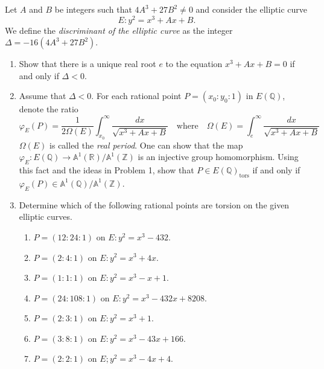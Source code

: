 \documentclass[12 pt, letterpaper]{hmcpset}
\begin{document}
\begin{problem}[Problem 3.]
	Let $A$ and $B$ be integers such that $4A^{3} + 27 B^{2} \neq 0$ and consider the elliptic curve
	\[
		E : y^{2} = x^{3} + A x + B.
	\]
	We define the \emph{discriminant of the elliptic curve} as the integer $\Delta = -16(4 A^{3} + 27 B^{2})$.
	\begin{enumerate}
		\item Show that there is a unique real root $e$ to the equation $x^{3} + A x + B = 0$ if and only if $\Delta < 0$.
		\item Assume that $\Delta < 0$. For each rational point $P = (x_{0} : y_{0} : 1)$ in $E(\mathbb{Q})$, denote the ratio
			\[
				\varphi_{E}(P) = \frac{1}{2 \Omega(E)} \int_{x_{0}}^{\infty} \frac{dx}{\sqrt{x^{3} + A x + B}} \quad \text{where} \quad \Omega(E) = \int_{e}^{\infty} \frac{dx}{\sqrt{x^{3} + Ax + B}} 
			\]
			$\Omega(E)$ is called the \emph{real period}. One can show that the map $\varphi_{E} : E(\mathbb{Q}) \to \mathbb{A}^{1}(\mathbb{R}) / \mathbb{A}^{1}(\mathbb{Z})$ is an injective group homomorphism. Using this fact and the ideas in Problem 1, show that $P \in E(\mathbb{Q})_{\text{tors}}$ if and only if $\varphi_{E}(P) \in \mathbb{A}^{1}(\mathbb{Q}) / \mathbb{A}^{1}(\mathbb{Z})$.
		\item Determine which of the following rational points are torsion on the given elliptic curves.
			\begin{enumerate}[label = (\roman*)]
				\item $P = (12 : 24 : 1)$ on $E : y^{2} = x^{3} - 432$.
				\item $P = (2 : 4 : 1)$ on $E : y^{2} = x^{3} + 4x$.
				\item $P = (1 : 1 : 1)$ on $E : y^{2} = x^{3} - x + 1$.
				\item $P = (24 : 108 : 1)$ on $E : y^{2} = x^{3} - 432 x + 8208$.
				\item $P = (2 : 3 : 1)$ on $E : y^{2} = x^{3} + 1$.
				\item $P = (3 : 8 : 1)$ on $E : y^{2} = x^{3} - 43 x + 166$.
				\item $P = (2 : 2 : 1)$ on $E ; y^{2} = x^{3} - 4x + 4$.
			\end{enumerate}
	\end{enumerate}
\end{problem}
\end{document}

